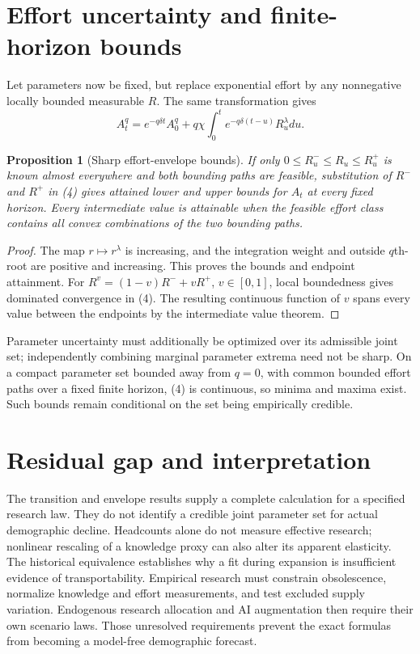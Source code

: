 \documentclass[11pt]{article}
\newtheorem{proposition}[theorem]{Proposition}
\theoremstyle{definition}
\begin{document}
\section*{Effort uncertainty and finite-horizon bounds}
Let parameters now be fixed, but replace exponential effort by any nonnegative locally bounded measurable $R$. The same transformation gives
\[
 A_t^q=e^{-q\delta t}A_0^q+
 q\chi\int_0^t e^{-q\delta(t-u)}R_u^\lambda du.
 \tag{4}
\]
\begin{proposition}[Sharp effort-envelope bounds]
If only $0\le R_u^-\le R_u\le R_u^+$ is known almost everywhere and both bounding paths are feasible, substitution of $R^-$ and $R^+$ in (4) gives attained lower and upper bounds for $A_t$ at every fixed horizon. Every intermediate value is attainable when the feasible effort class contains all convex combinations of the two bounding paths.
\end{proposition}
\begin{proof}
The map $r\mapsto r^\lambda$ is increasing, and the integration weight and outside $q$th-root are positive and increasing. This proves the bounds and endpoint attainment. For $R^v=(1-v)R^-+vR^+$, $v\in[0,1]$, local boundedness gives dominated convergence in (4). The resulting continuous function of $v$ spans every value between the endpoints by the intermediate value theorem.
\end{proof}
Parameter uncertainty must additionally be optimized over its admissible joint set; independently combining marginal parameter extrema need not be sharp. On a compact parameter set bounded away from $q=0$, with common bounded effort paths over a fixed finite horizon, (4) is continuous, so minima and maxima exist. Such bounds remain conditional on the set being empirically credible.

\section*{Residual gap and interpretation}
The transition and envelope results supply a complete calculation for a specified research law. They do not identify a credible joint parameter set for actual demographic decline. Headcounts alone do not measure effective research; nonlinear rescaling of a knowledge proxy can also alter its apparent elasticity. The historical equivalence establishes why a fit during expansion is insufficient evidence of transportability. Empirical research must constrain obsolescence, normalize knowledge and effort measurements, and test excluded supply variation. Endogenous research allocation and AI augmentation then require their own scenario laws. Those unresolved requirements prevent the exact formulas from becoming a model-free demographic forecast.
\end{document}
